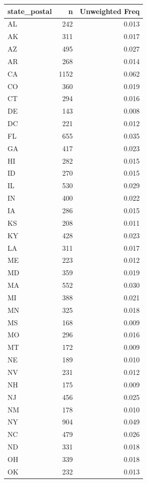 \documentclass[
]{krantz}
\begin{document}
\begin{tabular}[t]{l|r|r}
\hline
state\_postal & n & Unweighted Freq\\
\hline
AL & 242 & 0.013\\
\hline
AK & 311 & 0.017\\
\hline
AZ & 495 & 0.027\\
\hline
AR & 268 & 0.014\\
\hline
CA & 1152 & 0.062\\
\hline
CO & 360 & 0.019\\
\hline
CT & 294 & 0.016\\
\hline
DE & 143 & 0.008\\
\hline
DC & 221 & 0.012\\
\hline
FL & 655 & 0.035\\
\hline
GA & 417 & 0.023\\
\hline
HI & 282 & 0.015\\
\hline
ID & 270 & 0.015\\
\hline
IL & 530 & 0.029\\
\hline
IN & 400 & 0.022\\
\hline
IA & 286 & 0.015\\
\hline
KS & 208 & 0.011\\
\hline
KY & 428 & 0.023\\
\hline
LA & 311 & 0.017\\
\hline
ME & 223 & 0.012\\
\hline
MD & 359 & 0.019\\
\hline
MA & 552 & 0.030\\
\hline
MI & 388 & 0.021\\
\hline
MN & 325 & 0.018\\
\hline
MS & 168 & 0.009\\
\hline
MO & 296 & 0.016\\
\hline
MT & 172 & 0.009\\
\hline
NE & 189 & 0.010\\
\hline
NV & 231 & 0.012\\
\hline
NH & 175 & 0.009\\
\hline
NJ & 456 & 0.025\\
\hline
NM & 178 & 0.010\\
\hline
NY & 904 & 0.049\\
\hline
NC & 479 & 0.026\\
\hline
ND & 331 & 0.018\\
\hline
OH & 339 & 0.018\\
\hline
OK & 232 & 0.013\\
\hline

\end{tabular}
\end{document}
